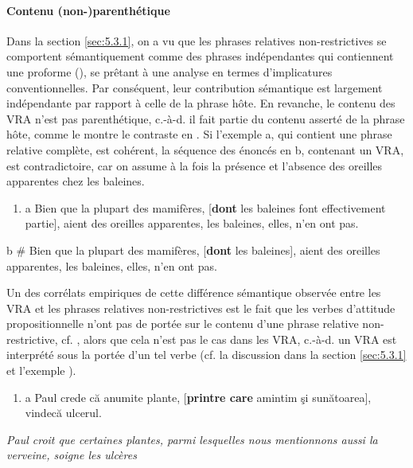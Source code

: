 \paragraph[Contenu (non{}-)parenthétique]{Contenu (non-)parenthétique}
Dans la section \ref{sec:5.3.1}, on a vu que les phrases relatives non-restrictives se comportent sémantiquement comme des phrases indépendantes qui contiennent une proforme (\citet{Arnold2004}), se prêtant à une analyse en termes d'implicatures conventionnelles. Par conséquent, leur contribution sémantique est largement indépendante par rapport à celle de la phrase hôte. En revanche, le contenu des VRA n'est pas parenthétique, c.-à-d. il fait partie du contenu asserté de la phrase hôte, comme le montre le contraste en . Si l'exemple a, qui contient une phrase relative complète, est cohérent, la séquence des énoncés en b, contenant un VRA, est contradictoire, car on assume à la fois la présence et l'absence des oreilles apparentes chez les baleines. 


\begin{enumerate}
\item \label{bkm:Ref295814041}a   Bien que la plupart des mamifères, [\textbf{dont} les baleines font effectivement partie], aient des oreilles apparentes, les baleines, elles, n'en ont pas. 


\end{enumerate}
  b  \# Bien que la plupart des mamifères, [\textbf{dont} les baleines], aient des oreilles apparentes, les baleines, elles, n'en ont pas. 

Un des corrélats empiriques de cette différence sémantique observée entre les VRA et les phrases relatives non-restrictives est le fait que les verbes d'attitude propositionnelle n'ont pas de portée sur le contenu d'une phrase relative non-restrictive, cf. , alors que cela n'est pas le cas dans les VRA, c.-à-d. un VRA est interprété sous la portée d'un tel verbe (cf. la discussion dans la section \ref{sec:5.3.1} et l'exemple ). 


\begin{enumerate}
\item \label{bkm:Ref295817928}a  Paul crede că anumite plante, [\textbf{printre care} amintim şi sunătoarea], vindecă ulcerul. 


\end{enumerate}
{\itshape
Paul croit que certaines plantes, parmi lesquelles nous mentionnons aussi la verveine, soigne les ulcères}

